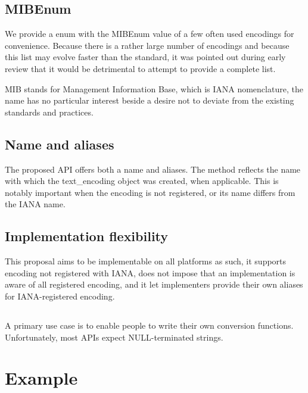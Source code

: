 \documentclass{wg21}
\begin{document}
\subsection{MIBEnum}

We provide a  enum with the MIBEnum value of a few often used encodings for convenience.
Because there is a rather large number of encodings and because this list may evolve faster than the standard, it was pointed out during early review that it would be detrimental to attempt to provide a complete list.
\begin{note}
MIB stands for Management Information Base, which is IANA nomenclature, the name has no particular interest beside a desire not to deviate from the existing standards and practices. 
\end{note}

\subsection{Name and aliases}

The proposed API offers both a name and aliases.
The  method reflects the name with which the text_encoding object was created, when applicable.
This is notably important when the encoding is not registered, or its name differs from the IANA name.

\subsection{Implementation flexibility}

This proposal aims to be implementable on all platforms as such, it supports encoding not registered with IANA, does not impose that
an implementation is aware of all registered encoding, and it let implementers provide their own aliases for IANA-registered encoding.

\subsection{}

A primary use case is to enable people to write their own conversion functions.
Unfortunately, most APIs expect NULL-terminated strings. 

\newpage
\section{Example}
\end{document}
